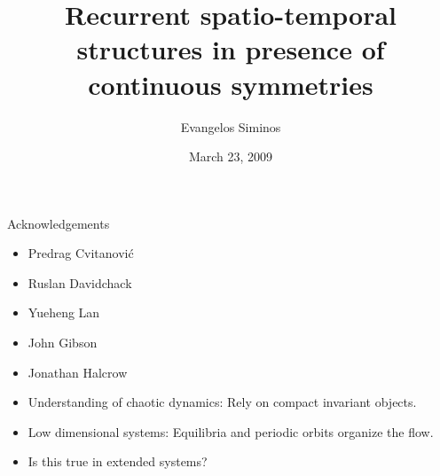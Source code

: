 \documentclass{beamer}
\title{Recurrent spatio-temporal structures in presence of continuous symmetries}
\author{Evangelos Siminos}
\institute{School of Physics\\ Georgia Institute of Technology}
\date{March 23, 2009}
\begin{document}
\begin{frame}
  \titlepage
\end{frame}


\begin{frame}{Acknowledgements}

\begin{itemize}
 \item Predrag Cvitanovi\'c
 \item Ruslan Davidchack
 \item Yueheng Lan
 \item John Gibson
 \item Jonathan Halcrow
\end{itemize}
 
\end{frame}


\begin{frame}{}
 \begin{itemize}
  \item Understanding of chaotic dynamics: Rely on compact invariant objects.
  \item Low dimensional systems: Equilibria and periodic orbits organize the flow.
  \item Is this true in extended systems?
 \end{itemize}

\end{frame}
\end{document}
